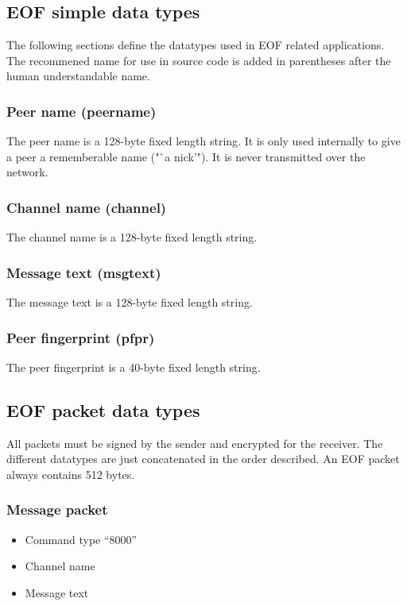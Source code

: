 \documentclass[12pt,a4paper]{book}
\begin{document}
\subsection{EOF simple data types}
The following sections define the datatypes used in EOF related
applications. The recommened name for use in source
code is added in parentheses after the human understandable name.
\subsubsection{Peer name (peername)}
The peer name is a 128-byte fixed length string. It is only
used internally to give a peer a rememberable name ("`a nick'").
It is never transmitted over the network.
\subsubsection{Channel name (channel)}
The channel name is a 128-byte fixed length string.
\subsubsection{Message text (msgtext)}
The message text is a 128-byte fixed length string.
\subsubsection{Peer fingerprint (pfpr)}
The peer fingerprint is a 40-byte fixed length string.
\subsection{EOF packet data types}
All packets must be signed by the sender and encrypted for the receiver.
The different datatypes are just concatenated in the order
described.
An EOF packet always contains 512 bytes.
\subsubsection{Message packet}
\begin{itemize}
\item Command type "`8000"'
\item Channel name
\item Message text
\end{itemize}
\end{document}
